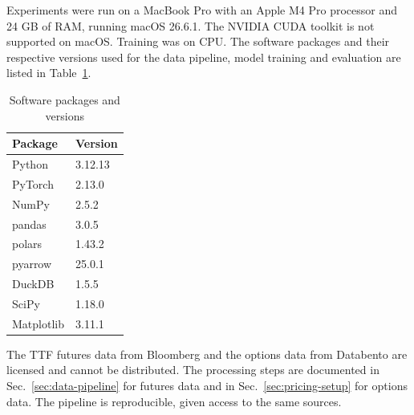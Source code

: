Experiments were run on a MacBook Pro with an Apple M4 Pro processor and 24 GB of RAM, running macOS 26.6.1. The NVIDIA CUDA toolkit is not supported on macOS. Training was on CPU. The software packages and their respective versions used for the data pipeline, model training and evaluation are listed in Table~\ref{tab:software}.

\begin{table}[htbp]
\centering
\begin{tabular}{ll}
\toprule
Package & Version \\
\midrule
Python & 3.12.13 \\
PyTorch & 2.13.0 \\
NumPy & 2.5.2 \\
pandas & 3.0.5 \\
polars & 1.43.2 \\
pyarrow & 25.0.1 \\
DuckDB & 1.5.5 \\
SciPy & 1.18.0 \\
Matplotlib & 3.11.1 \\
\bottomrule
\end{tabular}
\caption{Software packages and versions}
\label{tab:software}
\end{table}

The TTF futures data from Bloomberg and the options data from Databento are licensed and cannot be distributed. The processing steps are documented in Sec.~\ref{sec:data-pipeline} for futures data and in Sec.~\ref{sec:pricing-setup} for options data. The pipeline is reproducible, given access to the same sources.


